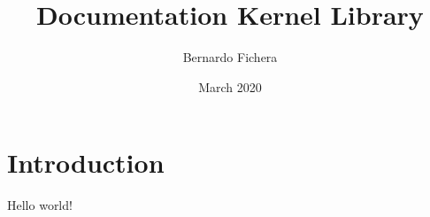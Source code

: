 \documentclass[12pt]{article}
\title{Documentation Kernel Library}
\author{Bernardo Fichera}
\date{March 2020}
\begin{document}
\maketitle

\section*{Introduction}

Hello world!
\end{document}
